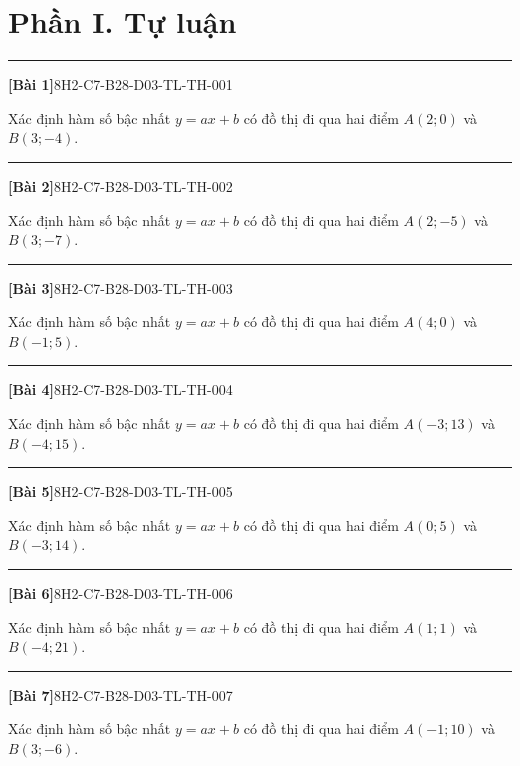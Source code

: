 \documentclass[12pt,a4paper]{article}
\newif\ifloigiai
\newenvironment{cauhoi}[2]{%
  \par\medskip\noindent\rule{\textwidth}{0.4pt}\par\nopagebreak
  \noindent\textbf{[#1]}\hfill{\scriptsize\ttfamily #2}\par\nopagebreak\smallskip}{\par}
\newcommand{\loigiai}[1]{\ifloigiai\par\smallskip\noindent\textit{Lời giải.} #1\par\fi}
\begin{document}
\section*{Phần I. Tự luận}
\begin{cauhoi}{Bài 1}{8H2-C7-B28-D03-TL-TH-001}
Xác định hàm số bậc nhất $y=ax+b$ có đồ thị đi qua hai điểm $A(2;0)$ và $B(3;-4)$.
\loigiai{Thay toạ độ $A$, $B$ vào $y=ax+b$ ta có hệ $0=2a+b$ và $-4=3a+b$. Trừ hai vế: $a=\dfrac{0+4}{2-3}=-4$. Suy ra $b=0+4\cdot(2)=8$. Vậy $y=-4x+8$.}
\end{cauhoi}
\begin{cauhoi}{Bài 2}{8H2-C7-B28-D03-TL-TH-002}
Xác định hàm số bậc nhất $y=ax+b$ có đồ thị đi qua hai điểm $A(2;-5)$ và $B(3;-7)$.
\loigiai{Thay toạ độ $A$, $B$ vào $y=ax+b$ ta có hệ $-5=2a+b$ và $-7=3a+b$. Trừ hai vế: $a=\dfrac{-5+7}{2-3}=-2$. Suy ra $b=-5+2\cdot(2)=-1$. Vậy $y=-2x-1$.}
\end{cauhoi}
\begin{cauhoi}{Bài 3}{8H2-C7-B28-D03-TL-TH-003}
Xác định hàm số bậc nhất $y=ax+b$ có đồ thị đi qua hai điểm $A(4;0)$ và $B(-1;5)$.
\loigiai{Thay toạ độ $A$, $B$ vào $y=ax+b$ ta có hệ $0=4a+b$ và $5=-a+b$. Trừ hai vế: $a=\dfrac{0-5}{4+1}=-1$. Suy ra $b=0+1\cdot(4)=4$. Vậy $y=-x+4$.}
\end{cauhoi}
\begin{cauhoi}{Bài 4}{8H2-C7-B28-D03-TL-TH-004}
Xác định hàm số bậc nhất $y=ax+b$ có đồ thị đi qua hai điểm $A(-3;13)$ và $B(-4;15)$.
\loigiai{Thay toạ độ $A$, $B$ vào $y=ax+b$ ta có hệ $13=-3a+b$ và $15=-4a+b$. Trừ hai vế: $a=\dfrac{13-15}{-3+4}=-2$. Suy ra $b=13+2\cdot(-3)=7$. Vậy $y=-2x+7$.}
\end{cauhoi}
\begin{cauhoi}{Bài 5}{8H2-C7-B28-D03-TL-TH-005}
Xác định hàm số bậc nhất $y=ax+b$ có đồ thị đi qua hai điểm $A(0;5)$ và $B(-3;14)$.
\loigiai{Thay toạ độ $A$, $B$ vào $y=ax+b$ ta có hệ $5=0a+b$ và $14=-3a+b$. Trừ hai vế: $a=\dfrac{5-14}{0+3}=-3$. Suy ra $b=5+3\cdot(0)=5$. Vậy $y=-3x+5$.}
\end{cauhoi}
\begin{cauhoi}{Bài 6}{8H2-C7-B28-D03-TL-TH-006}
Xác định hàm số bậc nhất $y=ax+b$ có đồ thị đi qua hai điểm $A(1;1)$ và $B(-4;21)$.
\loigiai{Thay toạ độ $A$, $B$ vào $y=ax+b$ ta có hệ $1=a+b$ và $21=-4a+b$. Trừ hai vế: $a=\dfrac{1-21}{1+4}=-4$. Suy ra $b=1+4\cdot(1)=5$. Vậy $y=-4x+5$.}
\end{cauhoi}
\begin{cauhoi}{Bài 7}{8H2-C7-B28-D03-TL-TH-007}
Xác định hàm số bậc nhất $y=ax+b$ có đồ thị đi qua hai điểm $A(-1;10)$ và $B(3;-6)$.
\loigiai{Thay toạ độ $A$, $B$ vào $y=ax+b$ ta có hệ $10=-a+b$ và $-6=3a+b$. Trừ hai vế: $a=\dfrac{10+6}{-1-3}=-4$. Suy ra $b=10+4\cdot(-1)=6$. Vậy $y=-4x+6$.}
\end{cauhoi}
\end{document}
